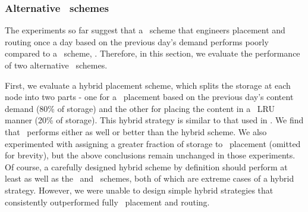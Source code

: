 \subsubsection{Alternative \planned\  schemes}
\label{sec:hybrid}

The experiments so far  suggest that a \planned\ scheme that engineers placement and routing once a day based on the previous day's demand performs poorly compared to a \unplanned\ scheme, \invlru. Therefore, in this section, we evaluate the performance of two alternative \planned\ schemes. 



First, we evaluate a hybrid placement scheme, which splits the storage at each node into two parts - one for a \planned\ placement based on the previous day's content demand (80\% of storage) and the other for placing the content in a \unplanned\ LRU manner (20\% of storage). This hybrid strategy is similar to that used in \cite{Applegate2010}. We find that \invlru\ performs either as well or better than the hybrid scheme.  We also experimented with assigning a greater fraction of storage to \unplanned\ placement (omitted for brevity), but the above conclusions remain unchanged in those experiments. Of course, a carefully designed hybrid scheme by definition should perform at least as well as the \unplanned\ and \planned\ schemes, both of which are extreme cases of a hybrid strategy. However, we were unable to design simple hybrid strategies that consistently outperformed fully \unplanned\ placement and routing.

